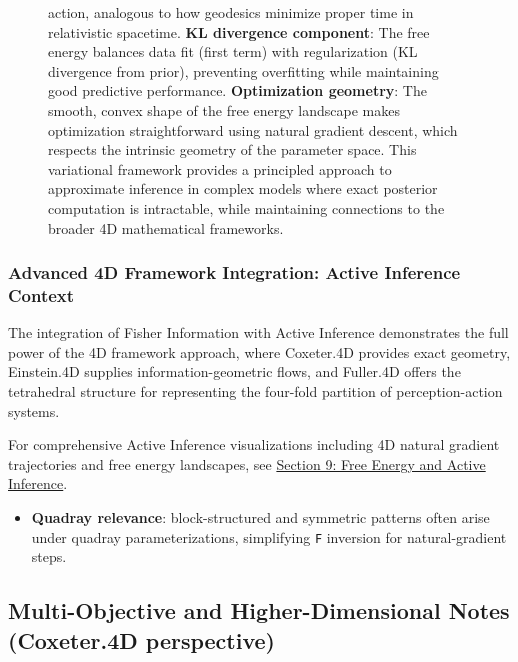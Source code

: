 \documentclass[
  10pt,
]{article}
\newcommand{\passthrough}[1]{#1}
\providecommand{\tightlist}{%
  \setlength{\itemsep}{0pt}\setlength{\parskip}{0pt}}
\begin{document}
\begin{figure}
{action, analogous to how geodesics minimize proper time in relativistic
spacetime. \textbf{KL divergence component}: The free energy balances
data fit (first term) with regularization (KL divergence from prior),
preventing overfitting while maintaining good predictive performance.
\textbf{Optimization geometry}: The smooth, convex shape of the free
energy landscape makes optimization straightforward using natural
gradient descent, which respects the intrinsic geometry of the parameter
space. This variational framework provides a principled approach to
approximate inference in complex models where exact posterior
computation is intractable, while maintaining connections to the broader
4D mathematical frameworks.}
\end{figure}

\hypertarget{advanced-4d-framework-integration-active-inference-context}{%
\subsubsection{Advanced 4D Framework Integration: Active Inference
Context}\label{advanced-4d-framework-integration-active-inference-context}}

The integration of Fisher Information with Active Inference demonstrates
the full power of the 4D framework approach, where Coxeter.4D provides
exact geometry, Einstein.4D supplies information-geometric flows, and
Fuller.4D offers the tetrahedral structure for representing the
four-fold partition of perception-action systems.

For comprehensive Active Inference visualizations including 4D natural
gradient trajectories and free energy landscapes, see
\href{09_free_energy_active_inference.md}{Section 9: Free Energy and
Active Inference}.

\begin{itemize}
\tightlist
\item
  \textbf{Quadray relevance}: block-structured and symmetric patterns
  often arise under quadray parameterizations, simplifying
  \passthrough{\lstinline!F!} inversion for natural-gradient steps.
\end{itemize}

\hypertarget{multi-objective-and-higher-dimensional-notes-coxeter.4d-perspective}{%
\subsection{Multi-Objective and Higher-Dimensional Notes (Coxeter.4D
perspective)}\label{multi-objective-and-higher-dimensional-notes-coxeter.4d-perspective}}
\end{document}
